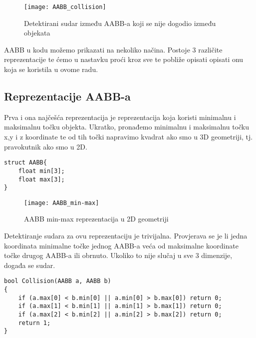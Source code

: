 \begin{figure}[!http]
	\begin{center}
		\texttt{[image: AABB\_collision]}
		\caption{Detektirani sudar između AABB-a koji se nije dogodio između objekata}
		\label{fig:2-1}
	\end{center}
\end{figure}

AABB u kodu možemo prikazati na nekoliko načina. Postoje 3 različite reprezentacije\cite{1} te ćemo u nastavku proći kroz sve te pobliže opisati opisati onu koja se koristila u ovome radu.

\subsection{Reprezentacije AABB-a}\label{sec::AABB_representation}

Prva i ona najčešća reprezentacija je reprezentacija koja koristi minimalnu i maksimalnu točku objekta.
Ukratko, pronađemo minimalnu i maksimalnu točku x,y i z koordinate te od tih točki napravimo kvadrat ako smo u 3D geometriji, tj. pravokutnik ako smo u 2D\cite{1}.

\begin{lstlisting}[style = {myC++},label ={code:1}, caption = {Struktura AABB-a koji koristi min i max točke}]
struct AABB{
	float min[3];
	float max[3];
}

\end{lstlisting}
\begin{figure}[!http]
 	\begin{center}
 		\texttt{[image: AABB\_min-max]}
 		\caption{AABB min-max reprezentacija u 2D geometriji}
 		\label{fig:3}
 	\end{center}
 \end{figure}
\newpage
Detektiranje sudara za ovu reprezentaciju je trivijalna. Provjerava se je li jedna koordinata minimalne točke jednog AABB-a veća od maksimalne koordinate točke drugog AABB-a ili obrnuto. Ukoliko to nije slučaj u sve 3 dimenzije, događa se sudar\cite{1}.

\begin{lstlisting}[style = {myC++},label={code:2}, caption = {Provjeravanje sudara za min-max reprezentaciju AABB-a\cite{1}}]
bool Collision(AABB a, AABB b)
{
	if (a.max[0] < b.min[0] || a.min[0] > b.max[0]) return 0;
	if (a.max[1] < b.min[1] || a.min[1] > b.max[1]) return 0;
	if (a.max[2] < b.min[2] || a.min[2] > b.max[2]) return 0;
	return 1;
}

\end{lstlisting}

